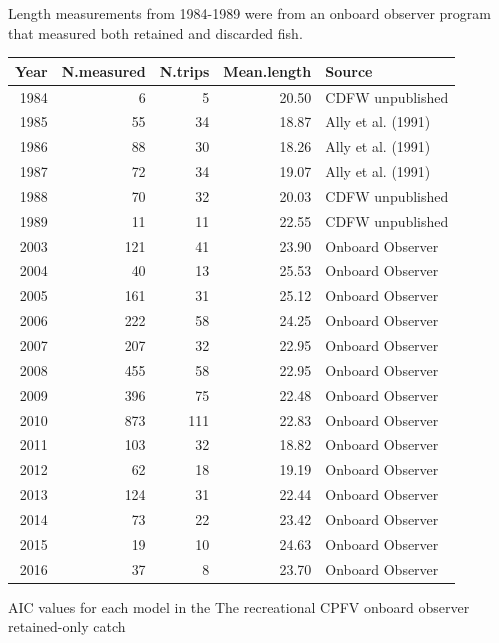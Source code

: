 \documentclass[12pt,]{article}
\begin{document}
\begin{table}[ht]
{                                            Length measurements from 1984-1989 were from an onboard
                                            observer program that measured both retained and discarded
                                            fish.} 
\label{tab:Fleet6_lengthsample}
\begin{tabular}{rrrrl}
  \hline
Year & N.measured & N.trips & Mean.length & Source \\ 
  \hline
1984 &   6 &   5 & 20.50 & CDFW unpublished \\ 
  1985 &  55 &  34 & 18.87 & Ally et al. (1991) \\ 
  1986 &  88 &  30 & 18.26 & Ally et al. (1991) \\ 
  1987 &  72 &  34 & 19.07 & Ally et al. (1991) \\ 
  1988 &  70 &  32 & 20.03 & CDFW unpublished \\ 
  1989 &  11 &  11 & 22.55 & CDFW unpublished \\ 
  2003 & 121 &  41 & 23.90 & Onboard Observer \\ 
  2004 &  40 &  13 & 25.53 & Onboard Observer \\ 
  2005 & 161 &  31 & 25.12 & Onboard Observer \\ 
  2006 & 222 &  58 & 24.25 & Onboard Observer \\ 
  2007 & 207 &  32 & 22.95 & Onboard Observer \\ 
  2008 & 455 &  58 & 22.95 & Onboard Observer \\ 
  2009 & 396 &  75 & 22.48 & Onboard Observer \\ 
  2010 & 873 & 111 & 22.83 & Onboard Observer \\ 
  2011 & 103 &  32 & 18.82 & Onboard Observer \\ 
  2012 &  62 &  18 & 19.19 & Onboard Observer \\ 
  2013 & 124 &  31 & 22.44 & Onboard Observer \\ 
  2014 &  73 &  22 & 23.42 & Onboard Observer \\ 
  2015 &  19 &  10 & 24.63 & Onboard Observer \\ 
  2016 &  37 &   8 & 23.70 & Onboard Observer \\ 
   \hline
\end{tabular}
\end{table}\begin{table}[ht]
\centering
\caption{AIC values for each model in the
                                          The recreational CPFV onboard 
                                          observer retained-only catch 
}
\end{table}
\end{document}
